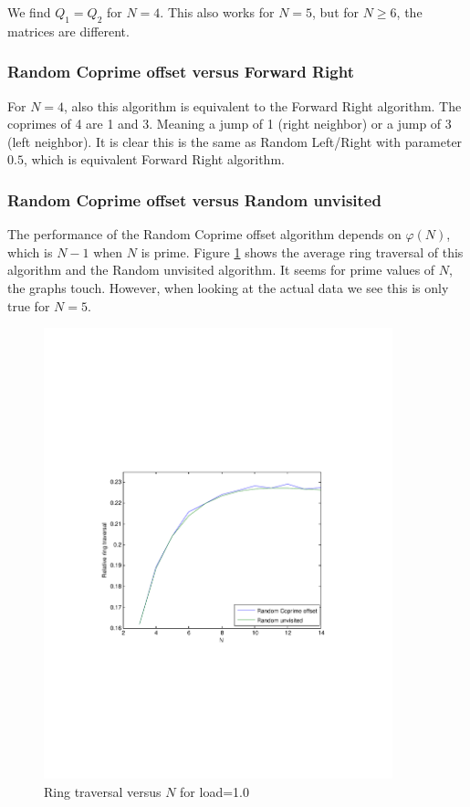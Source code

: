 \documentclass[10pt,a4paper]{article}
\begin{document}
We find $Q_1 = Q_2$ for $N=4$. This also works for $N=5$, but for $N \geq 6$, the matrices are different.

\subsubsection*{Random Coprime offset versus Forward Right}
For $N=4$, also this algorithm is equivalent to the Forward Right algorithm. The coprimes of 4 are 1 and 3. Meaning a jump of 1 (right neighbor) or a jump of 3 (left neighbor). It is clear this is the same as Random Left/Right with parameter $0.5$, which is equivalent Forward Right algorithm.

\subsubsection*{Random Coprime offset versus Random unvisited}
The performance of the Random Coprime offset algorithm depends on $\varphi(N)$, which is $N-1$ when $N$ is prime. Figure \ref{figrcovsru} shows the average ring traversal of this algorithm and the Random unvisited algorithm. It seems for prime values of $N$, the graphs touch. However, when looking at the actual data we see this is only true for $N=5$.

\begin{figure}[h!tb]
\centering
\includegraphics[clip=true, trim=9em 24em 9em 24em, width=0.9\textwidth]{resources/plotload10rurpo.pdf}
\caption{Ring traversal versus $N$ for load=1.0}
\label{figrcovsru}
\end{figure}
\end{document}
